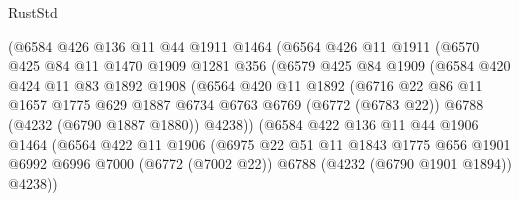 \begin{lexlean}{RustStd}
\begin{coremodule}
                  (@6584
                    @426
                    @136
                    @11
                    @44
                    @1911
                    @1464
                    (@6564
                      @426
                      @11
                      @1911
                      (@6570
                        @425
                        @84
                        @11
                        @1470
                        @1909
                        @1281
                        @356
                        (@6579
                          @425
                          @84
                          @1909
                          (@6584
                            @420
                            @424
                            @11
                            @83
                            @1892
                            @1908
                            (@6564
                              @420
                              @11
                              @1892
                              (@6716
                                @22
                                @86
                                @11
                                @1657
                                @1775
                                @629
                                @1887
                                @6734
                                @6763
                                @6769
                                (@6772 (@6783 @22))
                                @6788
                                (@4232 (@6790 @1887 @1880))
                                @4238))
                            (@6584
                              @422
                              @136
                              @11
                              @44
                              @1906
                              @1464
                              (@6564
                                @422
                                @11
                                @1906
                                (@6975
                                  @22
                                  @51
                                  @11
                                  @1843
                                  @1775
                                  @656
                                  @1901
                                  @6992
                                  @6996
                                  @7000
                                  (@6772 (@7002 @22))
                                  @6788
                                  (@4232 (@6790 @1901 @1894))
                                  @4238))

\end{coremodule}
\end{lexlean}
